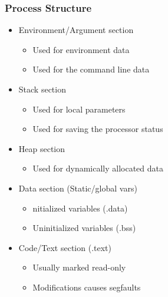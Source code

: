 \documentclass[12pt]{beamer}
\begin{document}
	\begin{frame}
		\frametitle{Process Structure}
		\begin{itemize}
			\small
			\item Environment/Argument section
			\begin{itemize}
				\item Used for environment data
				\item Used for the command line data
			\end{itemize}
			\item Stack section
			\begin{itemize}
				\item Used for local parameters
				\item Used for saving the processor status
			\end{itemize}
			\item Heap section
			\begin{itemize}
				\item Used for dynamically allocated data
			\end{itemize}
			\item Data section (Static/global vars)
			\begin{itemize}
				\item nitialized variables (.data)
				\item Uninitialized variables (.bss)
			\end{itemize}
			\item Code/Text section (.text)
			\begin{itemize}
				\item Usually marked read-only
				\item Modifications causes segfaults
			\end{itemize}
		\end{itemize}
	\end{frame}		
	
\end{document}

